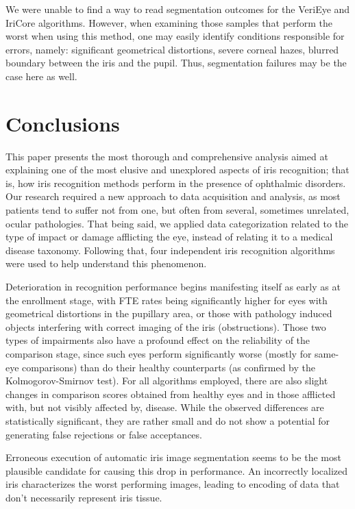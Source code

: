 \documentclass[article,12pt]{elsarticle}
\begin{document}
We were unable to find a way to read segmentation outcomes for the VeriEye and IriCore algorithms. However, when examining those samples that perform the worst when using this method, one may easily identify conditions responsible for errors, namely: significant geometrical distortions, severe corneal hazes, blurred boundary between the iris and the pupil. Thus, segmentation failures may be the case here as well.

\section{Conclusions} 
\label{conclusions}

This paper presents the most thorough and comprehensive analysis aimed at explaining one of the most elusive and unexplored aspects of iris recognition; that is, how iris recognition methods perform in the presence of ophthalmic disorders. Our research required a new approach to data acquisition and analysis, as most patients tend to suffer not from one, but often from several, sometimes unrelated, ocular pathologies. That being said, we applied data categorization related to the type of impact or damage afflicting the eye, instead of relating it to a medical disease taxonomy. Following that, four independent iris recognition algorithms were used to help understand this phenomenon.

Deterioration in recognition performance begins manifesting itself as early as at the enrollment stage, with FTE rates being significantly higher for eyes with geometrical distortions in the pupillary area, or those with pathology induced objects interfering with correct imaging of the iris (obstructions). Those two types of impairments also have a profound effect on the reliability of the comparison stage, since such eyes perform significantly worse (mostly for same-eye comparisons) than do their healthy counterparts (as confirmed by the Kolmogorov-Smirnov test). For all algorithms employed, there are also slight changes in comparison scores obtained from healthy eyes and in those afflicted with, but not visibly affected by, disease. While the observed differences are statistically significant, they are rather small and do not show a potential for generating false rejections or false acceptances.

Erroneous execution of automatic iris image segmentation seems to be the most plausible candidate for causing this drop in performance. An incorrectly localized iris characterizes the worst performing images, leading to encoding of data that don’t necessarily represent iris tissue.
\end{document}
